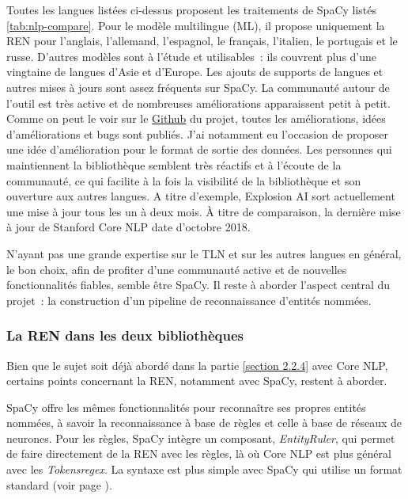 Toutes les langues listées ci-dessus proposent les traitements de SpaCy listés \autoref{tab:nlp-compare}. Pour le modèle multilingue (ML), il propose uniquement la REN pour l'anglais, l'allemand, l'espagnol, le français, l'italien, le portugais et le russe. D'autres modèles sont à l'étude et utilisables~: ils couvrent plus d'une vingtaine de langues d'Asie et d'Europe. Les ajouts de supports de langues et autres mises à jours sont assez fréquents sur SpaCy. La communauté autour de l'outil est très active et de nombreuses améliorations apparaissent petit à petit. Comme on peut le voir sur le \href{https://github.com/explosion/spaCy}{Github} \cite{spacy-repo} du projet, toutes les améliorations, idées d'améliorations et bugs sont publiés. J'ai notamment eu l'occasion de proposer une idée d'amélioration pour le format de sortie des données. Les personnes qui maintiennent la bibliothèque semblent très réactifs et à l'écoute de la communauté, ce qui facilite à la fois la visibilité de la bibliothèque et son ouverture aux autres langues. A titre d'exemple, Explosion AI sort actuellement une mise à jour tous les un à deux mois. À titre de comparaison, la dernière mise à jour de Stanford Core NLP date d'octobre 2018.
\newline

N'ayant pas une grande expertise sur le TLN et sur les autres langues en général, le bon choix, afin de profiter d'une communauté active et de nouvelles fonctionnalités fiables, semble être SpaCy. Il reste  à aborder l'aspect central du projet~: la construction d'un pipeline de reconnaissance d'entités nommées.
\label{section 3.1.3}


\subsubsection{La REN dans les deux bibliothèques}
Bien que le sujet soit déjà abordé dans la partie \ref{section 2.2.4} avec Core NLP, certains points concernant la REN, notamment avec SpaCy, restent à aborder. 
\newline

SpaCy offre les mêmes fonctionnalités pour reconnaître ses propres entités nommées, à savoir la reconnaissance à base de règles et celle à base de réseaux de neurones. Pour les règles, SpaCy intègre un composant, \textit{EntityRuler}, qui permet de faire directement de la REN avec les règles, là où Core NLP est plus général avec les \textit{Tokensregex}. La syntaxe est plus simple avec SpaCy qui utilise un format standard (voir page \pageref{rule-exemple}).
\newline

